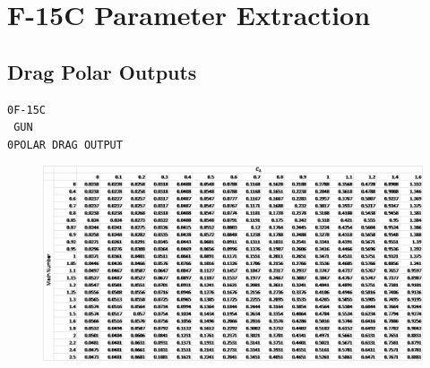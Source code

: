 \chapter{F-15C Parameter Extraction}
\renewcommand\thesection{\Alpha {A}}

\section{Drag Polar Outputs}
\label{section:dragpolar}
\label{app: polar}
\begin{verbatim}
0F-15C                               
 GUN                                      
0POLAR DRAG OUTPUT
\end{verbatim}
\begin{figure}[H]
    \centering
    \includegraphics[width = 15cm]{Thesis/Appendices/Drag_Polar_Example.png}
\end{figure}